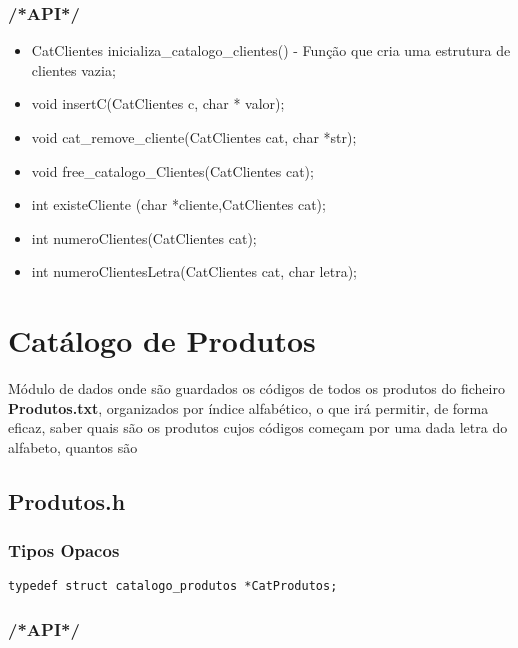 \subsubsection{/*API*/}

\begin{itemize}

\item CatClientes inicializa\_catalogo\_clientes() - Função que cria uma estrutura de clientes vazia;

\item void insertC(CatClientes c, char * valor);
\item void cat\_remove\_cliente(CatClientes cat, char *str);
\item void free\_catalogo\_Clientes(CatClientes cat);
\item int existeCliente (char *cliente,CatClientes cat);
\item int numeroClientes(CatClientes cat);
\item int numeroClientesLetra(CatClientes cat, char letra);


\end{itemize}

\section{Catálogo de Produtos}

 Módulo de dados onde são guardados os códigos de todos os produtos do ficheiro \textbf{Produtos.txt}, organizados por índice alfabético, o que irá permitir, de forma eficaz, saber quais são os produtos cujos códigos começam por uma dada letra do alfabeto, quantos são



\subsection{Produtos.h}

\subsubsection{Tipos Opacos}
\begin{verbatim}
typedef struct catalogo_produtos *CatProdutos;
\end{verbatim}

\subsubsection{/*API*/}


